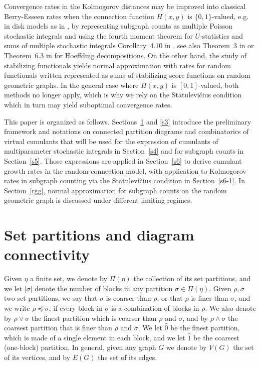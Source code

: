 \documentclass[bj,authoryear,noshowframe]{imsart}
\theoremstyle{plain}
\theoremstyle{remark}
\begin{document}
 Convergence rates in the Kolmogorov distances may be improved
 into classical Berry-Esseen rates when 
 the connection function $H(x,y)$ is $\{0,1\}$-valued, e.g. in disk models
 as in \cite{privaultkhops}, 
 by representing subgraph counts as multiple Poisson stochastic integrals
 and using the fourth moment theorem for $U$-statistics and sums of
 multiple stochastic integrals Corollary~4.10 in \cite{eichelsbacher}, 
 see also Theorem~3 in \cite{lachieze-rey} 
 or Theorem~6.3 in \cite{PS4} for Hoeffding decompositions.
 On the other hand, the study of stabilizing functionals \cite{penrose05,lachiezerey4} yields normal approximation with rates for random functionals written represented as sums of stabilizing score functions on random geometric graphs. In the general case where $H(x,y)$ is $[0,1]$-valued, both methods no longer apply, which is why we rely on the {Statulevi\v{c}ius condition} which in turn may yield suboptimal convergence rates. 
 
 This paper is organized as follows.
 Sections~\ref{s2} and \ref{s3} introduce the preliminary
 framework and notations on connected partition diagrams
 and combinatorics of virtual cumulants that will be used for 
 the expression of cumulants of multiparameter stochastic integrals
 in Section~\ref{s4} and for subgraph counts in Section~\ref{s5}. 
 Those expressions are applied in Section~\ref{s6}
 to derive cumulant growth rates in the random-connection model, with application to Kolmogorov rates in subgraph counting via the {Statulevi\v{c}ius condition} in Section~\ref{s6-1}.
 In Section~\ref{rgg}, normal approximation for subgraph counts on the random geometric graph is discussed under different limiting regimes. 

 \section{Set partitions and diagram connectivity} %
\label{s2}
\noindent
Given $\eta$ a finite set, we denote by $\Pi ( \eta )$ the collection
of its set partitions, and we let $|\sigma|$ denote the number of blocks in any partition $\sigma \in \Pi ( \eta )$. 
Given $\rho,\sigma$ two set partitions, we say that $\sigma$ is coarser than $\rho$,
or that $\rho$ is finer than $\sigma$,
and we write $\rho\preceq\sigma$,
if every block in $\sigma$ is a combination of blocks in $\rho$. 
We also denote by $\rho\vee\sigma$ the finest partition which is coarser than $\rho$ and $\sigma$, and by $\rho\wedge\sigma$ the coarsest partition that is finer than $\rho$ and $\sigma$.
We let $\widehat{0}$ be the finest partition, which is made of a single element in each block, and we let $\widehat{1}$ be the coarsest (one-block) partition. 
In general, given any graph $G$ we denote by $V(G)$ the set of its vertices, and by $E(G)$ the set of its edges.
\end{document}

